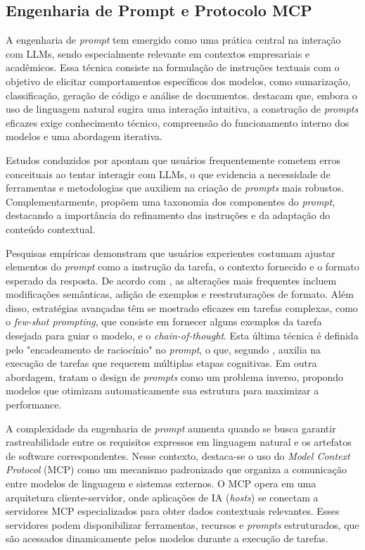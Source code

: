 \subsection{Engenharia de Prompt e Protocolo MCP}

A engenharia de \textit{prompt} tem emergido como uma prática central na interação com LLMs, sendo especialmente relevante em contextos empresariais e acadêmicos. Essa técnica consiste na formulação de instruções textuais com o objetivo de elicitar comportamentos específicos dos modelos, como sumarização, classificação, geração de código e análise de documentos.  destacam que, embora o uso de linguagem natural sugira uma interação intuitiva, a construção de \textit{prompts} eficazes exige conhecimento técnico, compreensão do funcionamento interno dos modelos e uma abordagem iterativa.

Estudos conduzidos por  apontam que usuários frequentemente cometem erros conceituais ao tentar interagir com LLMs, o que evidencia a necessidade de ferramentas e metodologias que auxiliem na criação de \textit{prompts} mais robustos. Complementarmente,  propõem uma taxonomia dos componentes do \textit{prompt}, destacando a importância do refinamento das instruções e da adaptação do conteúdo contextual.

Pesquisas empíricas demonstram que usuários experientes costumam ajustar elementos do \textit{prompt} como a instrução da tarefa, o contexto fornecido e o formato esperado da resposta. De acordo com , as alterações mais frequentes incluem modificações semânticas, adição de exemplos e reestruturações de formato. Além disso, estratégias avançadas têm se mostrado eficazes em tarefas complexas, como o \textit{few-shot prompting}, que consiste em fornecer alguns exemplos da tarefa desejada para guiar o modelo, e o \textit{chain-of-thought}. Esta última técnica é definida pelo "encadeamento de raciocínio" no \textit{prompt}, o que, segundo , auxilia na execução de tarefas que requerem múltiplas etapas cognitivas. Em outra abordagem,  tratam o design de \textit{prompts} como um problema inverso, propondo modelos que otimizam automaticamente sua estrutura para maximizar a performance.

A complexidade da engenharia de \textit{prompt} aumenta quando se busca garantir rastreabilidade entre os requisitos expressos em linguagem natural e os artefatos de software correspondentes. Nesse contexto, destaca-se o uso do \textit{Model Context Protocol} (MCP) como um mecanismo padronizado que organiza a comunicação entre modelos de linguagem e sistemas externos. O MCP opera em uma arquitetura cliente-servidor, onde aplicações de IA (\textit{hosts}) se conectam a servidores MCP especializados para obter dados contextuais relevantes. Esses servidores podem disponibilizar ferramentas, recursos e \textit{prompts} estruturados, que são acessados dinamicamente pelos modelos durante a execução de tarefas.

